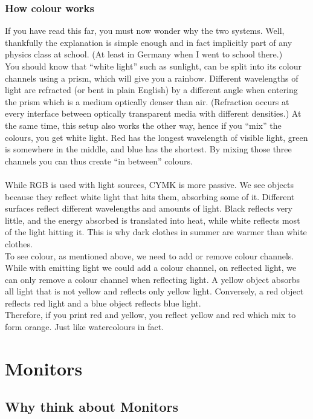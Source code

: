 \subsubsection{How colour works}

If you have read this far, you must now wonder why the two systems. Well, thankfully the explanation is simple enough and in fact implicitly part of any physics class at school. (At least in Germany when I went to school there.)
\\
You should know that ``white light'' such as sunlight, can be split into its colour channels using a prism, which will give you a rainbow. Different wavelengths of light are refracted (or bent in plain English) by a different angle when entering the prism which is a medium optically denser than air. (Refraction occurs at every interface between optically transparent media with different densities.) At the same time, this setup also works the other way, hence if you ``mix'' the colours, you get white light. Red has the longest wavelength of visible light, green is somewhere in the middle, and blue has the shortest. By mixing those three channels you can thus create ``in between'' colours.
\\
\\
While RGB is used with light sources, CYMK is more passive. We see objects because they reflect white light that hits them, absorbing some of it. Different surfaces reflect different wavelengths and amounts of light. Black reflects very little, and the energy absorbed is translated into heat, while white reflects most of the light hitting it. This is why dark clothes in summer are warmer than white clothes.
\\
To see colour, as mentioned above, we need to add or remove colour channels. While with emitting light we could add a colour channel, on reflected light, we can only remove a colour channel when reflecting light. A yellow object absorbs all light that is not yellow and reflects only yellow light. Conversely, a red object reflects red light and a blue object reflects blue light.
\\
Therefore, if you print red and yellow, you reflect yellow and red which mix to form orange. Just like watercolours in fact.


\section{Monitors}

\subsection{Why think about Monitors}

